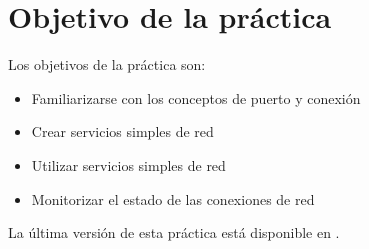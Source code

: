 
\usepackage{eurosym}


\renewcommand{\hmwkClass}{Planificación y Administración de Redes}
\renewcommand{\hmwkTitle}{Práctica de conexiones TCP}









\primerapagina

\setlength{\parindent}{0em}
\setlength{\parskip}{1em}



\section{Objetivo de la práctica}
Los objetivos  de la práctica son:
\begin{itemize}
\item Familiarizarse con los conceptos de puerto y conexión
\item Crear servicios simples de red
\item Utilizar servicios simples de red
\item Monitorizar el estado de las conexiones de red
\end{itemize}


La última versión de esta práctica está disponible en .


